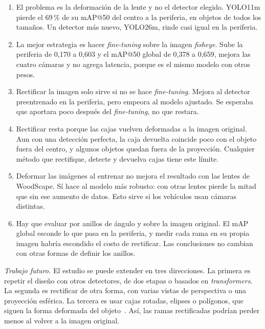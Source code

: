 \documentclass[conference]{IEEEtran}
\begin{document}
\begin{enumerate}
\item El problema es la deformación de la lente y no el detector elegido. YOLO11m pierde el 69\,\% de su mAP@50 del centro a la periferia, en objetos de todos los tamaños. Un detector más nuevo, YOLO26m, rinde casi igual en la periferia.
\item La mejor estrategia es hacer \textit{fine-tuning} sobre la imagen \textit{fisheye}. Sube la periferia de 0,170 a 0,603 y el mAP@50 global de 0,378 a 0,659, mejora las cuatro cámaras y no agrega latencia, porque es el mismo modelo con otros pesos.
\item Rectificar la imagen solo sirve si no se hace \textit{fine-tuning}. Mejora al detector preentrenado en la periferia, pero empeora al modelo ajustado. Se esperaba que aportara poco después del \textit{fine-tuning}, no que restara.
\item Rectificar resta porque las cajas vuelven deformadas a la imagen original. Aun con una detección perfecta, la caja devuelta coincide poco con el objeto fuera del centro, y algunos objetos quedan fuera de la proyección. Cualquier método que rectifique, detecte y devuelva cajas tiene este límite.
\item Deformar las imágenes al entrenar no mejora el resultado con las lentes de WoodScape. Sí hace al modelo más robusto: con otras lentes pierde la mitad que sin ese aumento de datos. Esto sirve si los vehículos usan cámaras distintas.
\item Hay que evaluar por anillos de ángulo y sobre la imagen original. El mAP global esconde lo que pasa en la periferia, y medir cada rama en su propia imagen habría escondido el costo de rectificar. Las conclusiones no cambian con otras formas de definir los anillos.
\end{enumerate}

\textit{Trabajo futuro.} El estudio se puede extender en tres direcciones. La primera es repetir el diseño con otros detectores, de dos etapas o basados en \textit{transformers}. La segunda es rectificar de otra forma, con varias vistas de perspectiva o una proyección esférica. La tercera es usar cajas rotadas, elipses o polígonos, que siguen la forma deformada del objeto~\cite{rashed2021generalized}. Así, las ramas rectificadas podrían perder menos al volver a la imagen original.
\end{document}
